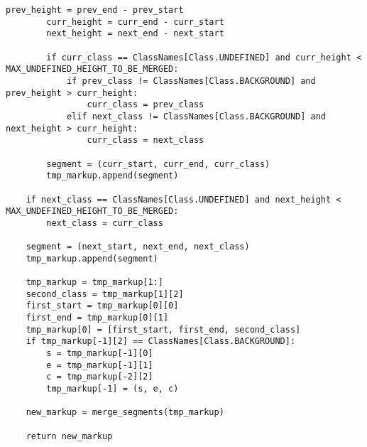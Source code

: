 \begin{lstlisting}[caption={Функция создания объединенной разметки (часть 3)}, label={lst:}]
        prev_height = prev_end - prev_start
        curr_height = curr_end - curr_start
        next_height = next_end - next_start

        if curr_class == ClassNames[Class.UNDEFINED] and curr_height < MAX_UNDEFINED_HEIGHT_TO_BE_MERGED:
            if prev_class != ClassNames[Class.BACKGROUND] and prev_height > curr_height:
                curr_class = prev_class
            elif next_class != ClassNames[Class.BACKGROUND] and next_height > curr_height:
                curr_class = next_class

        segment = (curr_start, curr_end, curr_class)
        tmp_markup.append(segment)

    if next_class == ClassNames[Class.UNDEFINED] and next_height < MAX_UNDEFINED_HEIGHT_TO_BE_MERGED:
        next_class = curr_class

    segment = (next_start, next_end, next_class)
    tmp_markup.append(segment)

    tmp_markup = tmp_markup[1:]
    second_class = tmp_markup[1][2]
    first_start = tmp_markup[0][0]
    first_end = tmp_markup[0][1]
    tmp_markup[0] = [first_start, first_end, second_class]
    if tmp_markup[-1][2] == ClassNames[Class.BACKGROUND]:
        s = tmp_markup[-1][0]
        e = tmp_markup[-1][1]
        c = tmp_markup[-2][2]
        tmp_markup[-1] = (s, e, c)

    new_markup = merge_segments(tmp_markup)

    return new_markup
\end{lstlisting}

